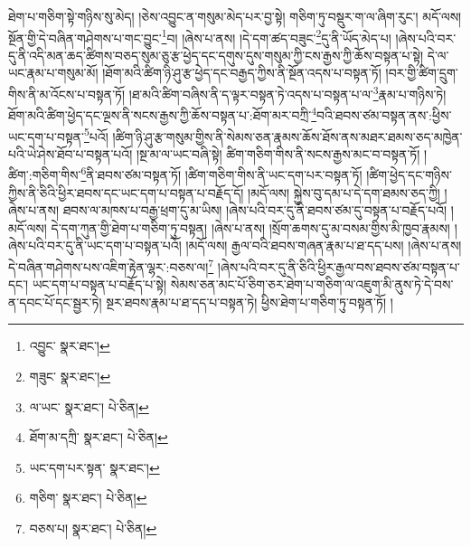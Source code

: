 ཐེག་པ་གཅིག་སྟེ་གཉིས་སུ་མེད། །ཅེས་འབྱུང་ན་གསུམ་མེད་པར་བྱ་སྟེ། གཅིག་ཏུ་བསྡུར་ག་ལ་ཞིག་རུང་། མདོ་ལས། སྔོན་གྱི་དེ་བཞིན་གཤེགས་པ་གང་བྱུང་\footnote{འབྱུང་  སྣར་ཐང་། }བ། །ཞེས་པ་ནས། །དེ་དག་ཚད་བཟུང་\footnote{གཟུང་  སྣར་ཐང་། }དུ་ནི་ཡོད་མེད་པ། །ཞེས་པའི་བར་དུ་ནི་འདི་མན་ཆད་ཚིགས་བཅད་སུམ་ཅུ་རྩ་ཕྱེད་དང་དགུས་དུས་གསུམ་ཀྱི་ངས་རྒྱས་ཀྱི་ཆོས་བསྟན་པ་སྟེ། དེ་ལ་ཡང་རྣམ་པ་གསུམ་མོ། །ཐོག་མའི་ཚིག་ཉི་ཤུ་རྩ་ཕྱེད་དང་བརྒྱད་ཀྱིས་ནི་སྔོན་འདས་པ་བསྟན་ཏོ། །བར་གྱི་ཚིག་དྲུག་གིས་ནི་མ་འོངས་པ་བསྟན་ཏོ། །ཐ་མའི་ཚིག་བཞིས་ནི་ད་ལྟར་བསྟན་ཏེ་འདས་པ་བསྟན་པ་ལ་\footnote{ལ་ཡང་  སྣར་ཐང་།  པེ་ཅིན། }རྣམ་པ་གཉིས་ཏེ། ཐོག་མའི་ཚིག་ཕྱེད་དང་ལྔས་ནི་སངས་རྒྱས་ཀྱི་ཆོས་བསྟན་པ་:ཐོག་མར་བཀྲི་\footnote{ཐོག་མ་དཀྲི་  སྣར་ཐང་།  པེ་ཅིན། }བའི་ཐབས་ཙམ་བསྟན་ནས་:ཕྱིས་ཡང་དག་པ་བསྟན་\footnote{ཡང་དག་པར་སྟན་  སྣར་ཐང་། }པའོ། །ཚིག་ཉི་ཤུ་རྩ་གསུམ་གྱིས་ནི་སེམས་ཅན་རྣམས་ཆོས་ཐོས་ནས་མཐར་ཐམས་ཅད་མཁྱེན་པའི་ཡེ་ཤེས་ཐོབ་པ་བསྟན་པའོ། །སྔ་མ་ལ་ཡང་བཞི་སྟེ། ཚིག་གཅིག་གིས་ནི་སངས་རྒྱས་མང་བ་བསྟན་ཏོ། །ཚིག་:གཅིག་གིས་\footnote{གཅིག་  སྣར་ཐང་།  པེ་ཅིན། }ནི་ཐབས་ཙམ་བསྟན་ཏོ། །ཚིག་གཅིག་གིས་ནི་ཡང་དག་པར་བསྟན་ཏོ། །ཚིག་ཕྱེད་དང་གཉིས་ཀྱིས་ནི་ཅིའི་ཕྱིར་ཐབས་དང་ཡང་དག་པ་བསྟན་པ་བརྗོད་དོ། །མདོ་ལས། སྐྱེས་བུ་དམ་པ་དེ་དག་ཐམས་ཅད་ཀྱི། །ཞེས་པ་ནས། ཐབས་ལ་མཁས་པ་བརྒྱ་ཕྲག་དུ་མ་ཡིས། །ཞེས་པའི་བར་དུ་ནི་ཐབས་ཙམ་དུ་བསྟན་པ་བརྗོད་པའོ། །མདོ་ལས། དེ་དག་ཀུན་གྱི་ཐེག་པ་གཅིག་ཏུ་བསྟན། །ཞེས་པ་ནས། །སྲོག་ཆགས་དུ་མ་བསམ་གྱིས་མི་ཁྱབ་རྣམས། །ཞེས་པའི་བར་དུ་ནི་ཡང་དག་པ་བསྟན་པའོ། །མདོ་ལས། རྒྱལ་བའི་ཐབས་གཞན་རྣམ་པ་ཐ་དད་པས། །ཞེས་པ་ནས། དེ་བཞིན་གཤེགས་པས་འཇིག་རྟེན་ལྷར་:བཅས་ལ།\footnote{བཅས་པ།  སྣར་ཐང་།  པེ་ཅིན། } །ཞེས་པའི་བར་དུ་ནི་ཅིའི་ཕྱིར་རྒྱལ་བས་ཐབས་ཙམ་བསྟན་པ་དང་། ཡང་དག་པ་བསྟན་པ་བརྗོད་པ་སྟེ། སེམས་ཅན་མང་པོ་ཅིག་ཅར་ཐེག་པ་གཅིག་ལ་འཇུག་མི་ནུས་ཏེ་དེ་བས་ན་དབང་པོ་དང་སྦྱར་ཏེ། སྔར་ཐབས་རྣམ་པ་ཐ་དད་པ་བསྟན་ཏེ། ཕྱིས་ཐེག་པ་གཅིག་ཏུ་བསྟན་ཏོ། །
